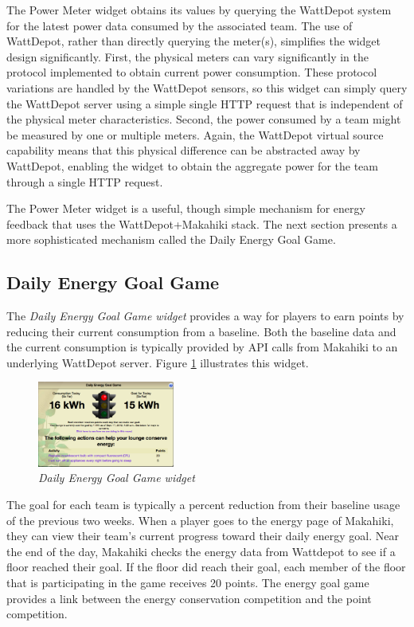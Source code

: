 The Power Meter widget obtains its values by querying the WattDepot system for the latest power data consumed by the associated team.  The use of WattDepot, rather than directly querying the meter(s), simplifies the widget design significantly.  First, the physical meters can vary significantly in the protocol implemented to obtain current power consumption.   These protocol variations are handled by the WattDepot sensors, so this widget can simply query the WattDepot server using a simple single HTTP request that is independent of the physical meter characteristics.  Second, the power consumed by a team might be measured by one or multiple meters.  Again, the WattDepot virtual source capability means that this physical difference can be abstracted away by WattDepot, enabling the widget to obtain the aggregate power for the team through a single HTTP request. 

The Power Meter widget is a useful, though simple mechanism for energy feedback that uses the WattDepot+Makahiki stack.   The next section presents a more sophisticated mechanism called the Daily Energy Goal Game.

\subsection{Daily Energy Goal Game}

The {\em Daily Energy Goal Game widget} provides a way for players to earn points by reducing their current consumption from a baseline. Both the baseline data and the current consumption is typically provided by API calls from Makahiki to an underlying WattDepot server.
Figure \ref{fig:DailyEnergyGoal} illustrates this widget.

\begin{figure}[th]
  \center
  \includegraphics[width=0.4\textwidth]{daily-energy-goal-game.eps}
  \caption{\em \small Daily Energy Goal Game widget}
  \label{fig:DailyEnergyGoal}
\end{figure}

The goal for each team is typically a percent reduction from their baseline usage of the previous two weeks. When a player goes to the energy page of Makahiki, they can view their team's current progress toward their daily energy goal. Near the end of the day, Makahiki checks the energy data from Wattdepot to see if a floor reached their goal. If the floor did reach their goal, each member of the floor that is participating in the game receives 20 points. The energy goal game provides a link between the energy conservation competition and the point competition.

